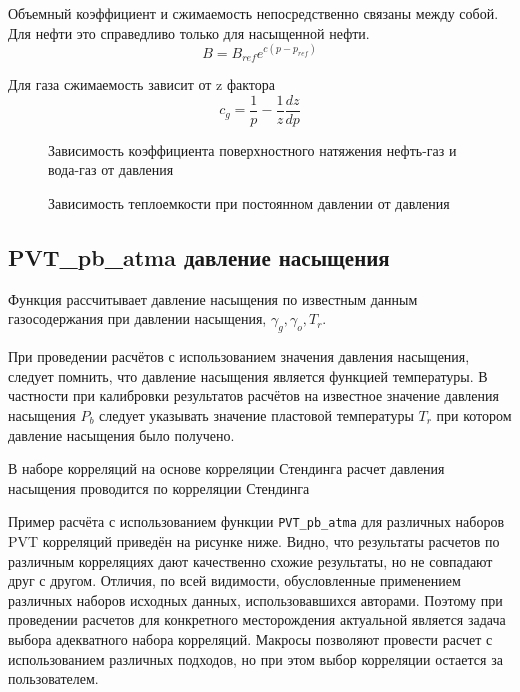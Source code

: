 Объемный коэффициент и сжимаемость непосредственно связаны между собой. Для нефти это справедливо только для насыщенной нефти. 
$$ B=B_{ref} e^{c(p-p_{ref})}$$

Для газа сжимаемость зависит от z фактора
$$c_g = \frac{1}{p} - \frac{1}{z} \frac{dz}{dp}$$

\begin{figure}[H]
	\caption{Зависимость коэффициента поверхностного натяжения нефть-газ и вода-газ от давления}
	\label{ris:st_plot}
\end{figure}

\begin{figure}[H]
	\caption{Зависимость теплоемкости при постоянном давлении от давления}
	\label{ris:heat_cap_plot}
\end{figure}

\subsection{PVT\_pb\_atma давление насыщения}
Функция рассчитывает давление насыщения по известным данным газосодержания при давлении насыщения, $\gamma_g, \gamma_o, T_r$.

При проведении расчётов с использованием значения давления насыщения, следует помнить, что давление насыщения является функцией температуры. В частности при калибровки результатов расчётов на известное значение давления насыщения $P_b$ следует указывать значение пластовой температуры $T_r$ при котором давление насыщения было получено. 

В наборе корреляций на основе корреляции Стендинга расчет давления насыщения проводится по корреляции Стендинга \cite{Yukos_PVT_2002}


Пример расчёта с использованием функции \texttt{PVT_pb_atma} для различных наборов PVT корреляций приведён на рисунке ниже. Видно, что результаты расчетов по различным корреляциях дают качественно схожие результаты, но не совпадают друг с другом.  Отличия, по всей видимости,  обусловленные применением различных наборов исходных данных, использовавшихся авторами. Поэтому при проведении расчетов для конкретного месторождения актуальной является задача выбора адекватного набора корреляций. Макросы \unf{} позволяют провести расчет с использованием различных подходов, но при этом выбор корреляции остается за пользователем. 

